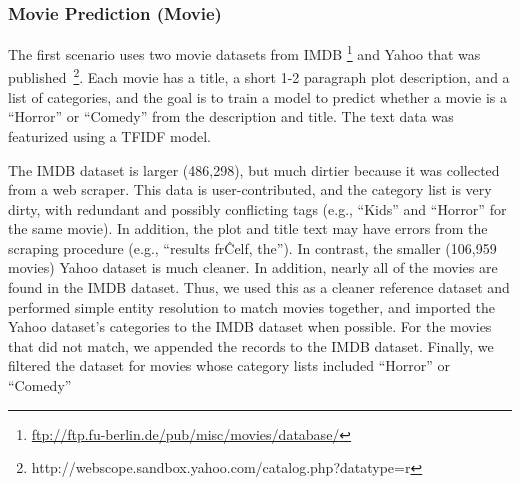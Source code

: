 \subsubsection{Movie Prediction (Movie)}
The first scenario uses two movie datasets from IMDB \footnote{\tiny \url{ftp://ftp.fu-berlin.de/pub/misc/movies/database/}} and Yahoo that was published~\footnote{http://webscope.sandbox.yahoo.com/catalog.php?datatype=r}.
Each movie has a title, a short 1-2 paragraph plot description, and a list of categories, and the goal is to train a model to predict whether a movie is a ``Horror'' or ``Comedy'' from the description and title.  
The text data was featurized using a TFIDF model.

The IMDB dataset is larger (486,298), but much dirtier because it was collected from a web scraper.  
This data is user-contributed, and the category list is very dirty, with redundant and possibly conflicting tags (e.g., ``Kids'' and ``Horror'' for the same movie).  
In addition, the plot and title text may have errors from the scraping procedure (e.g., ``results fr\^Celf, the'').
In contrast, the smaller (106,959 movies) Yahoo dataset is much cleaner.  In addition, nearly all of the movies are found in the IMDB dataset.
Thus, we used this as a cleaner reference dataset and performed simple entity resolution to match movies together, and imported the Yahoo dataset's categories to the IMDB dataset when possible.
For the movies that did not match, we appended the records to the IMDB dataset.
Finally, we filtered the dataset for movies whose category lists included ``Horror'' or ``Comedy''

% 

